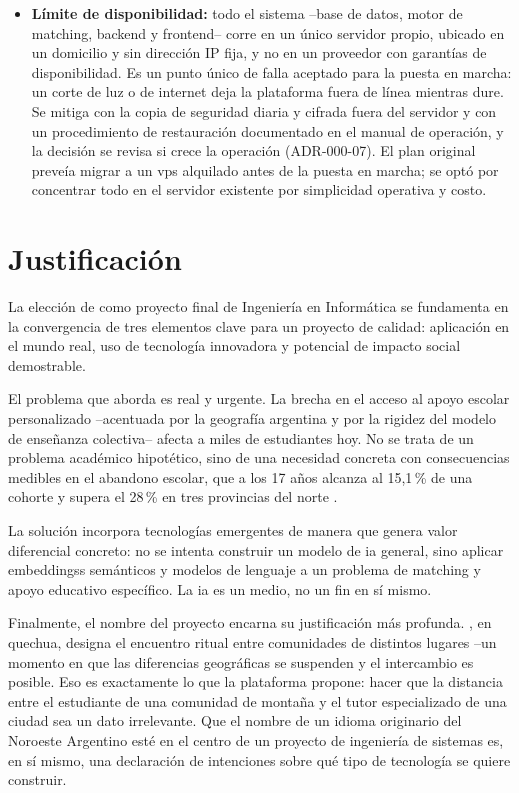 \begin{itemize}
          de la personalización ofrecida.
    \item \textbf{Límite de disponibilidad:} todo el sistema --base de
          datos, motor de \gls{matching}, backend y frontend-- corre en un
          único servidor propio, ubicado en un domicilio y sin dirección
          IP fija, y no en un proveedor con garantías de disponibilidad.
          Es un punto único de falla aceptado para la puesta en marcha: un corte de
          luz o de internet deja la plataforma fuera de línea mientras
          dure. Se mitiga con la copia de seguridad diaria y cifrada fuera
          del servidor y con un procedimiento de restauración documentado
          en el manual de operación, y la decisión se
          revisa si crece la operación (ADR-000-07). El plan original
          preveía migrar a un \gls{vps} alquilado antes de la puesta en marcha; se
          optó por concentrar todo en el servidor existente por
          simplicidad operativa y costo.
\end{itemize}

\section{Justificación}\label{sec:justificacion}

La elección de \sistema{} como proyecto final de Ingeniería en
Informática se fundamenta en la convergencia de tres elementos clave
para un proyecto de calidad: aplicación en el mundo real, uso de
tecnología innovadora y potencial de impacto social demostrable.

El problema que \sistema{} aborda es real y urgente. La brecha en el
acceso al apoyo escolar personalizado --acentuada por la geografía
argentina y por la rigidez del modelo de enseñanza colectiva-- afecta a
miles de estudiantes hoy. No se trata de un problema académico
hipotético, sino de una necesidad concreta con consecuencias medibles en
el abandono escolar, que a los 17 años alcanza al 15,1\,\% de una cohorte
y supera el 28\,\% en tres provincias del norte \citep{miguez2023}.

La solución incorpora tecnologías emergentes de manera que genera valor
diferencial concreto: no se intenta construir un modelo de \gls{ia}
general, sino aplicar \glspl{embeddings} semánticos y modelos de lenguaje a
un problema de \gls{matching} y apoyo educativo específico. La \gls{ia}
es un medio, no un fin en sí mismo.

Finalmente, el nombre del proyecto encarna su justificación más
profunda. \sistema{}, en quechua, designa el encuentro ritual entre
comunidades de distintos lugares --un momento en que las diferencias
geográficas se suspenden y el intercambio es posible. Eso es exactamente
lo que la plataforma propone: hacer que la distancia entre el estudiante
de una comunidad de montaña y el tutor especializado de una ciudad sea
un dato irrelevante. Que el nombre de un idioma originario del Noroeste
Argentino esté en el centro de un proyecto de ingeniería de sistemas es,
en sí mismo, una declaración de intenciones sobre qué tipo de tecnología
se quiere construir.

